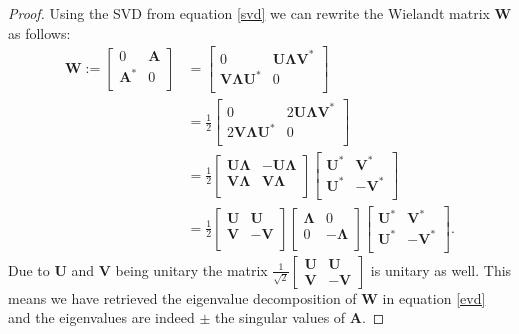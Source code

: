 \documentclass[a4paper, oneside]{thirdparty_stylesheets/discothesis}
\begin{document}
\begin{proof}
	Using the SVD from equation \ref{svd} we can rewrite the Wielandt matrix $\mathbf{W}$ as follows:
	\begin{align}
		\mathbf{W} := 
		\begin{bmatrix}
			0 & \mathbf{A} \\
			\mathbf{A}^* & 0 \\
		\end{bmatrix} &=
		\begin{bmatrix}
			0 & \mathbf{U}\boldsymbol{\Lambda}\mathbf{V}^* \\
			\mathbf{V}\boldsymbol{\Lambda}\mathbf{U}^*& 0 \\
		\end{bmatrix}\\ 
		&= \frac{1}{2}
		\begin{bmatrix}
			0 & 2\mathbf{U}\boldsymbol{\Lambda}\mathbf{V}^* \\
			2\mathbf{V}\boldsymbol{\Lambda}\mathbf{U}^*& 0 \\
		\end{bmatrix}\\ 
		&= \frac{1}{2}
		\begin{bmatrix}
			\mathbf{U}\boldsymbol{\Lambda} & -\mathbf{U}\boldsymbol{\Lambda} \\
			\mathbf{V}\boldsymbol{\Lambda}& \mathbf{V}\boldsymbol{\Lambda} \\
		\end{bmatrix} 
		\begin{bmatrix}
			\mathbf{U^*} & \mathbf{V^*} \\
			\mathbf{U^*} & -\mathbf{V^*} \\
		\end{bmatrix}\\ 
		& = \frac{1}{2}
		\begin{bmatrix}
			\mathbf{U} & \mathbf{U} \\
			\mathbf{V} & -\mathbf{V} \\
		\end{bmatrix}
		\begin{bmatrix}
			\boldsymbol{\Lambda} & 0 \\
			0 & -\boldsymbol{\Lambda} \\
		\end{bmatrix}
		\begin{bmatrix}
			\mathbf{U^*} & \mathbf{V^*} \\
			\mathbf{U^*} & -\mathbf{V^*} \\
		\end{bmatrix}. \label{evd}
	\end{align}
	Due to $\mathbf{U}$ and $\mathbf{V}$ being unitary the matrix 
	$\frac{1}{\sqrt{2}}
	\begin{bmatrix}
		\mathbf{U} & \mathbf{U} \\
		\mathbf{V} & \mathbf{-V}
	\end{bmatrix}$
	is unitary as well.
	This means we have retrieved the eigenvalue decomposition of $\mathbf{W}$ in equation \ref{evd} and the eigenvalues are indeed $\pm$ the singular values of $\mathbf{A}$.

\end{proof}
\end{document}
